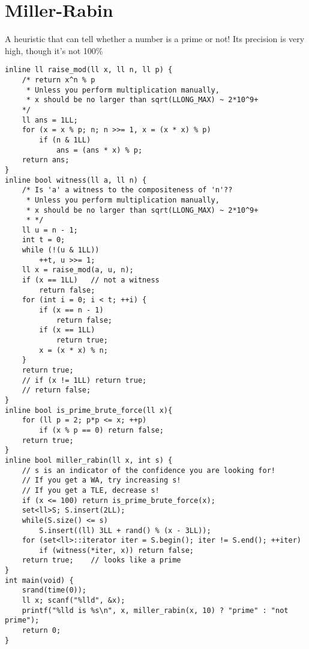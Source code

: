 \documentclass[12pt]{book}
\begin{document}
\section{Miller-Rabin}
A heuristic that can tell whether a number is a prime or not!
Its precision is very high, though it's not 100\%
\begin{verbatim}
inline ll raise_mod(ll x, ll n, ll p) {
	/* return x^n % p
	 * Unless you perform multiplication manually,
	 * x should be no larger than sqrt(LLONG_MAX) ~ 2*10^9+
	*/
	ll ans = 1LL;
	for (x = x % p; n; n >>= 1, x = (x * x) % p)
		if (n & 1LL)
			ans = (ans * x) % p;
	return ans;
}
inline bool witness(ll a, ll n) {
	/* Is 'a' a witness to the compositeness of 'n'??
	 * Unless you perform multiplication manually,
	 * x should be no larger than sqrt(LLONG_MAX) ~ 2*10^9+
	 * */
	ll u = n - 1;
	int t = 0;
	while (!(u & 1LL))
		++t, u >>= 1;
	ll x = raise_mod(a, u, n);
	if (x == 1LL)	// not a witness
		return false;
	for (int i = 0; i < t; ++i) {
		if (x == n - 1)
			return false;
		if (x == 1LL)
			return true;
		x = (x * x) % n;
	}
	return true;
	// if (x != 1LL) return true;
	// return false;
}
inline bool is_prime_brute_force(ll x){
	for (ll p = 2; p*p <= x; ++p)
		if (x % p == 0) return false;
	return true;
}
inline bool miller_rabin(ll x, int s) {
	// s is an indicator of the confidence you are looking for!
	// If you get a WA, try increasing s!
	// If you get a TLE, decrease s!
	if (x <= 100) return is_prime_brute_force(x);
	set<ll>S; S.insert(2LL);
	while(S.size() <= s)
		S.insert((ll) 3LL + rand() % (x - 3LL));
	for (set<ll>::iterator iter = S.begin(); iter != S.end(); ++iter)
		if (witness(*iter, x)) return false;
	return true;	// looks like a prime
}
int main(void) {
	srand(time(0));
	ll x; scanf("%lld", &x);
	printf("%lld is %s\n", x, miller_rabin(x, 10) ? "prime" : "not prime");
	return 0;
}
\end{verbatim}
\end{document}
